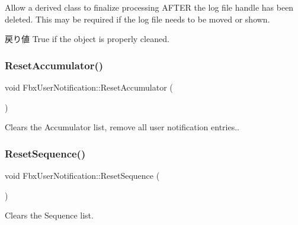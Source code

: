 Allow a derived class to finalize processing A\+F\+T\+ER the log file handle has been deleted. This may be required if the log file needs to be moved or shown. \begin{DoxyReturn}{戻り値}
True if the object is properly cleaned. 
\end{DoxyReturn}
\mbox{\label{class_fbx_user_notification_ac22297d000470fb8317a37631a651405}} 
\subsubsection{\texorpdfstring{Reset\+Accumulator()}{ResetAccumulator()}}
{\footnotesize\ttfamily void Fbx\+User\+Notification\+::\+Reset\+Accumulator (\begin{DoxyParamCaption}{ }\end{DoxyParamCaption})\hspace{0.3cm}{\ttfamily [protected]}}



Clears the Accumulator list, remove all user notification entries.. 

\mbox{\label{class_fbx_user_notification_af86faaf21fa589ddaeca8289449e0fb4}} 
\subsubsection{\texorpdfstring{Reset\+Sequence()}{ResetSequence()}}
{\footnotesize\ttfamily void Fbx\+User\+Notification\+::\+Reset\+Sequence (\begin{DoxyParamCaption}{ }\end{DoxyParamCaption})\hspace{0.3cm}{\ttfamily [protected]}}



Clears the Sequence list. 

\mbox{\label{class_fbx_user_notification_a8606241edfd85444dee6a5c924947830}} 
